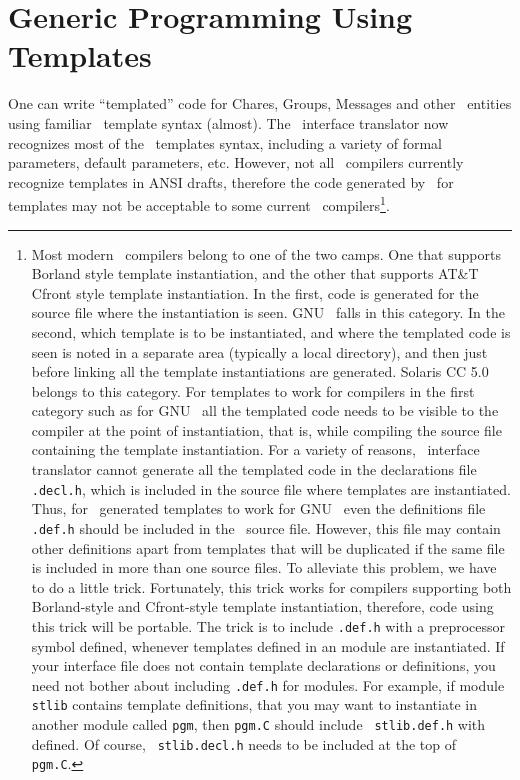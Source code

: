 \section{Generic Programming Using Templates}

One can write ``templated'' code for Chares, Groups, Messages and other
\charmpp\  entities using familiar \CC\ template syntax (almost). The \charmpp\
interface translator now recognizes most of the \CC\ templates syntax,
including a variety of formal parameters, default parameters, etc. However, not
all \CC\ compilers currently recognize templates in ANSI drafts, therefore the
code generated by \charmpp\ for templates may not be acceptable to some current
\CC\ compilers\footnote{ Most modern \CC\ compilers belong to one of the two
camps. One that supports Borland style template instantiation, and the other
that supports AT\&T Cfront style template instantiation. In the first, code is
generated for the source file where the instantiation is seen.  GNU \CC\ falls
in this category.  In the second, which template is to be instantiated, and
where the templated code is seen is noted in a separate area (typically a local
directory), and then just before linking all the template instantiations are
generated. Solaris CC 5.0 belongs to this category. For templates to work for
compilers in the first category such as for GNU \CC\ all the templated code
needs to be visible to the compiler at the point of instantiation, that is,
while compiling the source file containing the template instantiation. For a
variety of reasons, \charmpp\ interface translator cannot generate all the
templated code in the declarations file {\tt *.decl.h}, which is included in
the source file where templates are instantiated. Thus, for \charmpp\ generated
templates to work for GNU \CC\ even the definitions file {\tt *.def.h} should
be included in the \CC\ source file. However, this file may contain other
definitions apart from templates that will be duplicated if the same file is
included in more than one source files. To alleviate this problem, we have to
do a little trick. Fortunately, this trick works for compilers supporting both
Borland-style and Cfront-style template instantiation, therefore, code using
this trick will be portable. The trick is to include {\tt *.def.h} with a
preprocessor symbol \kw{CK\_TEMPLATES\_ONLY} defined, whenever templates
defined in an \kw{extern} module are instantiated. If your interface file does
not contain template declarations or definitions, you need not bother about
including {\tt *.def.h} for \kw{extern} modules.  For example, if module {\tt
stlib} contains template definitions, that you may want to instantiate in
another module called {\tt pgm}, then {\tt pgm.C} should include {\tt
stlib.def.h} with \kw{CK\_TEMPLATES\_ONLY} defined. Of course, {\tt
stlib.decl.h} needs to be included at the top of {\tt pgm.C}.  }. 

